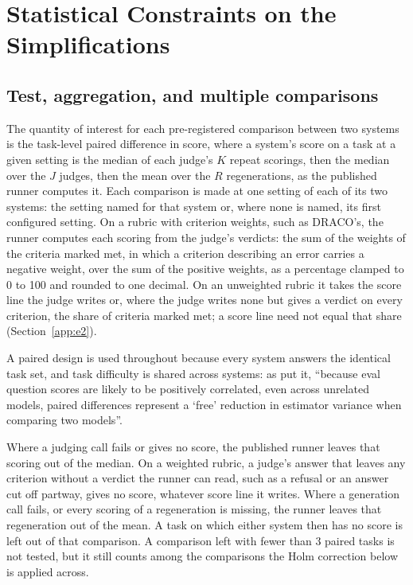 \documentclass[11pt]{article}
\newcommand{\sectionbreak}{\par\ifdim\pagetotal<5.5\baselineskip\relax\else\clearpage\fi}
\begin{document}
\sectionbreak
\section{Statistical Constraints on the Simplifications}
\label{sec:stats}

\subsection{Test, aggregation, and multiple comparisons}
\label{sec:test}

The quantity of interest for each pre-registered comparison between two systems is the
task-level paired difference in score, where a system's score on a task at a given setting is the median of each judge's $K$ repeat scorings, then the median over the $J$ judges, then the mean over the $R$ regenerations, as the published runner computes it. Each comparison is made at one setting of each of its two systems: the setting named for that system or, where none is named, its first configured setting. On a rubric with criterion weights, such as DRACO's, the runner computes each scoring from the judge's verdicts: the sum of the weights of the criteria marked met, in which a criterion describing an error carries a negative weight, over the sum of the positive weights, as a percentage clamped to 0 to 100 and rounded to one decimal. On an unweighted rubric it takes the score line the judge writes or, where the judge writes none but gives a verdict on every criterion, the share of criteria marked met; a score line need not equal that share (Section~\ref{app:e2}).

A paired design is used throughout because every
system answers the identical task set, and task difficulty is shared across systems: as
\citet{miller2024errorbars} put it, ``because eval question scores are likely to be
positively correlated, even across unrelated models, paired differences represent a `free'
reduction in estimator variance when comparing two models''.

Where a judging call fails or gives no score, the published runner leaves that scoring out of the median. On a weighted rubric, a judge's answer that leaves any criterion without a verdict the runner can read, such as a refusal or an answer cut off partway, gives no score, whatever score line it writes. Where a generation call fails, or every scoring of a regeneration is missing, the runner leaves that regeneration out of the mean. A task on which either system then has no score is left out of that comparison. A comparison left with fewer than 3 paired tasks is not tested, but it still counts among the comparisons the Holm correction below is applied across.
\end{document}
